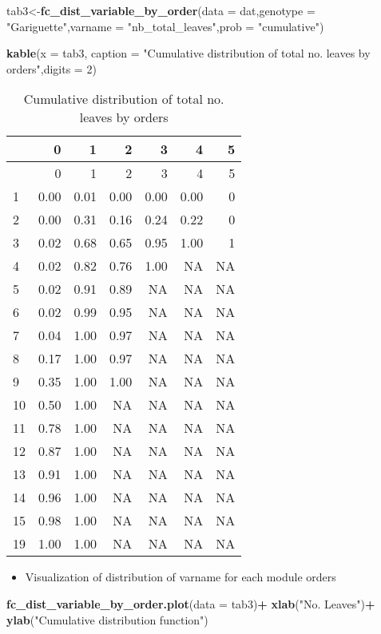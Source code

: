 \documentclass[]{article}
\newenvironment{Shaded}{\begin{snugshade}}{\end{snugshade}}
\newcommand{\KeywordTok}[1]{\textcolor[rgb]{0.13,0.29,0.53}{\textbf{#1}}}
\newcommand{\DataTypeTok}[1]{\textcolor[rgb]{0.13,0.29,0.53}{#1}}
\newcommand{\DecValTok}[1]{\textcolor[rgb]{0.00,0.00,0.81}{#1}}
\newcommand{\StringTok}[1]{\textcolor[rgb]{0.31,0.60,0.02}{#1}}
\newcommand{\OperatorTok}[1]{\textcolor[rgb]{0.81,0.36,0.00}{\textbf{#1}}}
\newcommand{\NormalTok}[1]{#1}
\providecommand{\tightlist}{%
  \setlength{\itemsep}{0pt}\setlength{\parskip}{0pt}}
\begin{document}
\begin{Shaded}
\begin{Highlighting}[]
\NormalTok{tab3<-}\KeywordTok{fc_dist_variable_by_order}\NormalTok{(}\DataTypeTok{data =}\NormalTok{ dat,}\DataTypeTok{genotype =} \StringTok{"Gariguette"}\NormalTok{,}\DataTypeTok{varname =} \StringTok{"nb_total_leaves"}\NormalTok{,}\DataTypeTok{prob =} \StringTok{"cumulative"}\NormalTok{)}

\KeywordTok{kable}\NormalTok{(}\DataTypeTok{x =}\NormalTok{ tab3, }
      \DataTypeTok{caption =} \StringTok{"Cumulative distribution of total no. leaves by orders"}\NormalTok{,}\DataTypeTok{digits =} \DecValTok{2}\NormalTok{)}
\end{Highlighting}
\end{Shaded}

\begin{longtable}[]{@{}lrrrrrr@{}}
\caption{Cumulative distribution of total no. leaves by
orders}\tabularnewline
\toprule
& 0 & 1 & 2 & 3 & 4 & 5\tabularnewline
\midrule
\endfirsthead
\toprule
& 0 & 1 & 2 & 3 & 4 & 5\tabularnewline
\midrule
\endhead
1 & 0.00 & 0.01 & 0.00 & 0.00 & 0.00 & 0\tabularnewline
2 & 0.00 & 0.31 & 0.16 & 0.24 & 0.22 & 0\tabularnewline
3 & 0.02 & 0.68 & 0.65 & 0.95 & 1.00 & 1\tabularnewline
4 & 0.02 & 0.82 & 0.76 & 1.00 & NA & NA\tabularnewline
5 & 0.02 & 0.91 & 0.89 & NA & NA & NA\tabularnewline
6 & 0.02 & 0.99 & 0.95 & NA & NA & NA\tabularnewline
7 & 0.04 & 1.00 & 0.97 & NA & NA & NA\tabularnewline
8 & 0.17 & 1.00 & 0.97 & NA & NA & NA\tabularnewline
9 & 0.35 & 1.00 & 1.00 & NA & NA & NA\tabularnewline
10 & 0.50 & 1.00 & NA & NA & NA & NA\tabularnewline
11 & 0.78 & 1.00 & NA & NA & NA & NA\tabularnewline
12 & 0.87 & 1.00 & NA & NA & NA & NA\tabularnewline
13 & 0.91 & 1.00 & NA & NA & NA & NA\tabularnewline
14 & 0.96 & 1.00 & NA & NA & NA & NA\tabularnewline
15 & 0.98 & 1.00 & NA & NA & NA & NA\tabularnewline
19 & 1.00 & 1.00 & NA & NA & NA & NA\tabularnewline
\bottomrule
\end{longtable}

\begin{itemize}
\tightlist
\item
  Visualization of distribution of varname for each module orders
\end{itemize}

\begin{Shaded}
\begin{Highlighting}[]
\KeywordTok{fc_dist_variable_by_order.plot}\NormalTok{(}\DataTypeTok{data =}\NormalTok{ tab3)}\OperatorTok{+}
\StringTok{  }\KeywordTok{xlab}\NormalTok{(}\StringTok{"No. Leaves"}\NormalTok{)}\OperatorTok{+}
\StringTok{  }\KeywordTok{ylab}\NormalTok{(}\StringTok{"Cumulative distribution function"}\NormalTok{)}
\end{Highlighting}
\end{Shaded}
\end{document}
